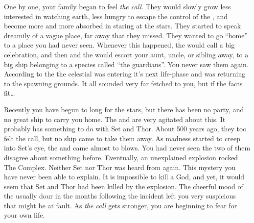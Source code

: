 \documentclass[char]{guardians}
\begin{document}
One by one, your family began to feel \emph{the call}. They would slowly grow less interested in watching earth, less hungry to escape the control of the \cWarden{}, and become more and more absorbed in staring at the stars. They started to speak dreamily of a vague place, far away that they missed. They wanted to go ``home'' to a place you had never seen. Whenever this happened, the \cCaretaker{} would call a big celebration, and then \cCaretaker{\they} and the \cWarden{} would escort your aunt, uncle, or sibling away, to a big ship belonging to a species called ``the guardians''. You never saw them again.  According to the \cCaretaker{} the celestial was entering it's next life-phase and was returning to the spawning grounds. It all sounded very far fetched to you, but if the facts fit\ldots{}

Recently you have begun to long for the stars, but there has been no party, and no great ship to carry you home. The \cCaretaker{} and \cWarden{} are very agitated about this. It probably has something to do with Set and Thor. About 500 years ago, they too felt the call, but no ship came to take them away. As madness started to creep into Set's eye, the \cCaretaker{} and \cWarden{} came almost to blows. You had never seen the two of them disagree about something before.  Eventually, an unexplained explosion rocked The Complex. Neither Set nor Thor was heard from again. This mystery you have never been able to explain. It is impossible to kill a God, and yet, it would seem that Set and Thor had been killed by the explosion. The cheerful mood of the usually dour \cWarden{} in the months following the incident left you very suspicious that \cWarden{\they} might be at fault. As \emph{the call} gets stronger, you are beginning to fear for your own life.
\end{document}
